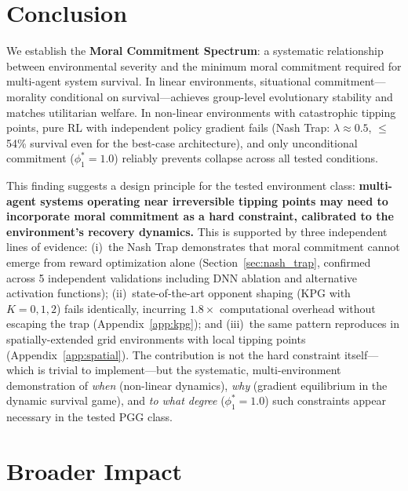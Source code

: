 \documentclass{article}
\begin{document}
\section{Conclusion}

We establish the \textbf{Moral Commitment Spectrum}: a systematic relationship between environmental severity and the minimum moral commitment required for multi-agent system survival.
In linear environments, situational commitment---morality conditional on survival---achieves group-level evolutionary stability and matches utilitarian welfare.
In non-linear environments with catastrophic tipping points, pure RL with independent policy gradient fails (Nash Trap: $\lambda \approx 0.5$, $\leq$54\% survival even for the best-case architecture), and only unconditional commitment ($\phi_1^* = 1.0$) reliably prevents collapse across all tested conditions.

This finding suggests a design principle for the tested environment class: \textbf{multi-agent systems operating near irreversible tipping points may need to incorporate moral commitment as a hard constraint, calibrated to the environment's recovery dynamics.}
This is supported by three independent lines of evidence:
(i)~the Nash Trap demonstrates that moral commitment cannot emerge from reward optimization alone (Section~\ref{sec:nash_trap}, confirmed across 5 independent validations including DNN ablation and alternative activation functions);
(ii)~state-of-the-art opponent shaping (KPG with $K{=}0,1,2$) fails identically, incurring $1.8\times$ computational overhead without escaping the trap (Appendix~\ref{app:kpg});
and (iii)~the same pattern reproduces in spatially-extended grid environments with local tipping points (Appendix~\ref{app:spatial}).
The contribution is not the hard constraint itself---which is trivial to implement---but the systematic, multi-environment demonstration of \emph{when} (non-linear dynamics), \emph{why} (gradient equilibrium in the dynamic survival game), and \emph{to what degree} ($\phi_1^* = 1.0$) such constraints appear necessary in the tested PGG class.

\section*{Broader Impact}\label{sec:broader_impact}
\end{document}
